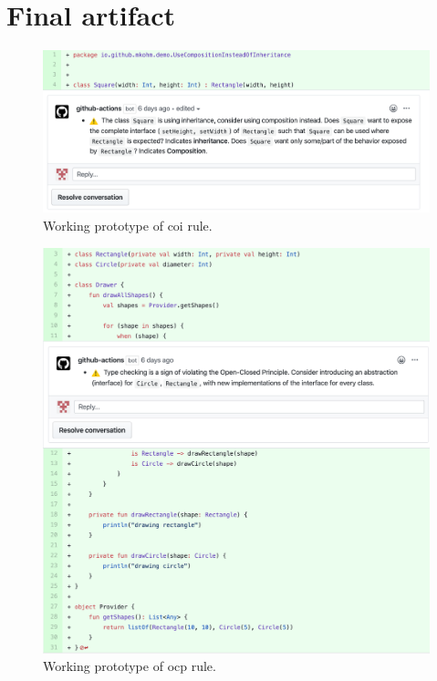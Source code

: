\clearpage
\section{Final artifact}
\label{final-artifact}
\begin{figure}[h!]
    \centering
    \includegraphics[width=\textwidth]{images/final_coh.png}
    \caption{Working prototype of \gls{coi} rule.}
\end{figure}

\begin{figure}[h!]
    \centering
    \includegraphics[width=\textwidth]{images/final_ocp.png}
    \caption{Working prototype of \gls{ocp} rule.}
\end{figure}

